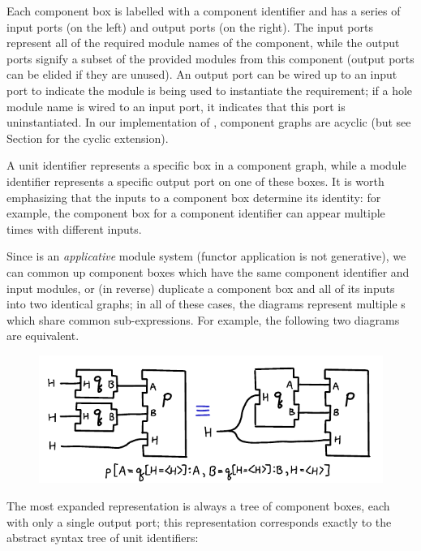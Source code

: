 \noindent
Each component box is labelled with a component identifier and has a
series of input ports (on the left) and output ports (on the right). The
input ports represent all of the required module names of the component,
while the output ports signify a subset of the provided modules from
this component (output ports can be elided if they are unused). An
output port can be wired up to an input port to indicate the module is
being used to instantiate the requirement; if a hole module name is
wired to an input port, it indicates that this port is uninstantiated.
In our implementation of \Backpack{}, component graphs are acyclic
(but see Section  for the cyclic extension).

A unit identifier represents a specific box in a component graph, while
a module identifier represents a specific output port on one of these
boxes. It is worth emphasizing that the inputs to a component box
determine its identity: for example, the component box for a component
identifier can appear multiple times with different inputs.

Since \Backpack{} is an \emph{applicative} module system (functor
application is not generative), we can common up component boxes which
have the same component identifier and input modules, or (in reverse)
duplicate a component box and all of its inputs into two identical
graphs; in all of these cases, the diagrams represent multiple \uid{}s
which share common sub-expressions.  For example, the following
two diagrams are equivalent.

\begin{figure}[H]
\center\includegraphics{figures/unit-identifier-pictorial-equivalence-example-2.pdf}
\end{figure}

The most expanded representation is always a tree of component boxes, each
with only a single output port; this representation corresponds exactly
to the abstract syntax tree of unit identifiers:

